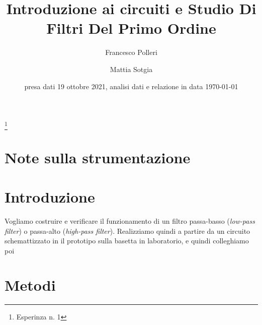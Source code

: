 \documentclass[
    rmp,
    reprint, 
    superscriptaddress, 
    altaffilletter, 
    amsmath, 
    amssymb, 
    a4paper]{revtex4-2}
\begin{document}
\title{
    Introduzione ai circuiti e Studio Di Filtri Del Primo Ordine
}
\thanks{
    Esperinza n. 1
}

\author{Francesco Polleri}
\author{Mattia Sotgia}


\date{presa dati
    19 ottobre 2021, analisi dati e relazione in data 
    \today
}

\begin{abstract}

        
\end{abstract}
\maketitle
\thispagestyle{fancy}

\section*{Note sulla strumentazione}


\section{Introduzione}
\label{section:introduction}
Vogliamo costruire e verificare il funzionamento di un filtro passa-basso (\textit{low-pass filter}) o passa-alto (\textit{high-pass filter}). Realizziamo quindi a partire da un circuito schemattizzato in  il prototipo sulla basetta in laboratorio, e quindi colleghiamo poi 


\section{Metodi}
\label{section:methods}
\end{document}
